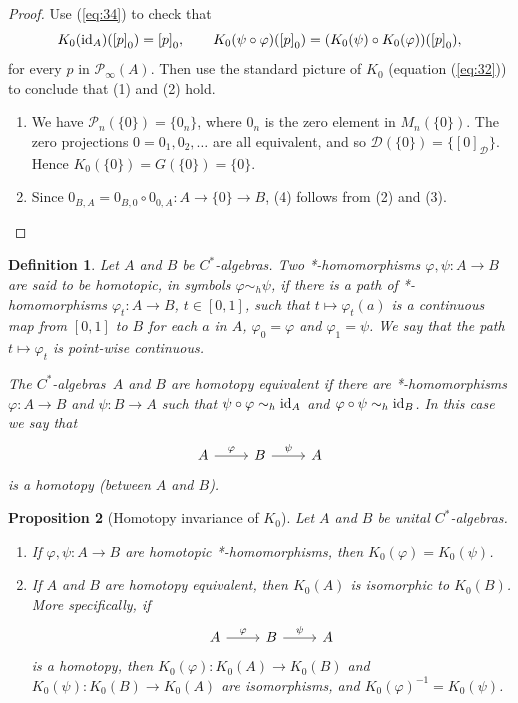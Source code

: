\documentclass{book}
\newtheorem{definition}{Definition}[section]
\newtheorem{proposition}[definition]{Proposition}
\def\cstars{\(C^*\)-algebras}
\begin{document}
\begin{proof}
  Use (\ref{eq:34}) to check that
  \[
    K_0(\textnormal{id}_A)({[p]}_0)={[p]}_0,\qquad K_0(\psi\circ\varphi)({[p]}_0)=(K_0(\psi)\circ K_0(\varphi))({[p]}_0),
  \]  
  for every \(p\) in \(\mathcal{P}_\infty(A)\). Then use the standard picture of \(K_0\) (equation (\ref{eq:32})) to conclude that (1) and (2) hold.
  \begin{enumerate}
    \item[3.] We have \(\mathcal{P}_n(\{0\})=\{0_n\}\), where \(0_n\) is the zero element in \(M_n(\{0\})\).
    The zero projections \(0=0_1,0_2,\ldots\) are all equivalent, and so \(\mathcal{D}(\{0\})=\{{[0]_\mathcal{D}}\}\).
    Hence \(K_0(\{0\})=G(\{0\})=\{0\}\).
    \item[4.] Since \(0_{B,A}=0_{B,0}\circ 0_{0,A}:A\rightarrow \{0\}\rightarrow B\), (4) follows from (2) and (3).
  \end{enumerate}
\end{proof}
\begin{definition}\label{def:Lars625}
  Let \(A\) and \(B\) be \cstars. Two *-homomorphisms \(\varphi, \psi:A\rightarrow B\) are said to be \textnormal{homotopic}, in symbols \(\varphi\sim_h\psi\), if there is a path of *-homomorphisms 
  \(\varphi_t:A\rightarrow B\), \(t\in[0,1]\), such that \(t\mapsto \varphi_t(a)\) is a continuous map from \([0,1]\) to \(B\) for each \(a\) in \(A\),
  \(\varphi_0=\varphi\) and \(\varphi_1=\psi\). We say that the path \(t\mapsto \varphi_t\) is \textnormal{point-wise continuous}.\par
  The \cstars\ \(A\) and \(B\) are \textnormal{homotopy equivalent} if there are *-homomorphisms \(\varphi:A\rightarrow B\) and \(\psi:B\rightarrow A\) such that \(\psi\circ\varphi\sim_h\textnormal{id}_A\)
  and \(\varphi\circ\psi\sim_h\textnormal{id}_B\). In this case we say that
  \[
    \begin{tikzcd}
    A \arrow[r, "\varphi"]& B \arrow[r, "\psi"]&A
    \end{tikzcd}
  \]
  is a \textnormal{homotopy} (between \(A\) and \(B\)).
\end{definition}
\begin{proposition}[Homotopy invariance of \(K_0\)]\label{prop:626}
  Let \(A\) and \(B\) be unital \cstars.
  \begin{enumerate}
    \item If \(\varphi, \psi:A\rightarrow B\) are homotopic *-homomorphisms, then \(K_0(\varphi)=K_0(\psi)\).
    \item If \(A\) and \(B\) are homotopy equivalent, then \(K_0(A)\) is isomorphic to \(K_0(B)\). More specifically, if
    \[
    \begin{tikzcd}
    A \arrow[r, "\varphi"]& B \arrow[r, "\psi"]&A
    \end{tikzcd}
    \]
    is a homotopy, then \(K_0(\varphi):K_0(A)\rightarrow K_0(B)\) and \(K_0(\psi):K_0(B)\rightarrow K_0(A)\) are isomorphisms,
    and \({K_0(\varphi)}^{-1}=K_0(\psi)\).
  \end{enumerate}
\end{proposition}
\end{document}
